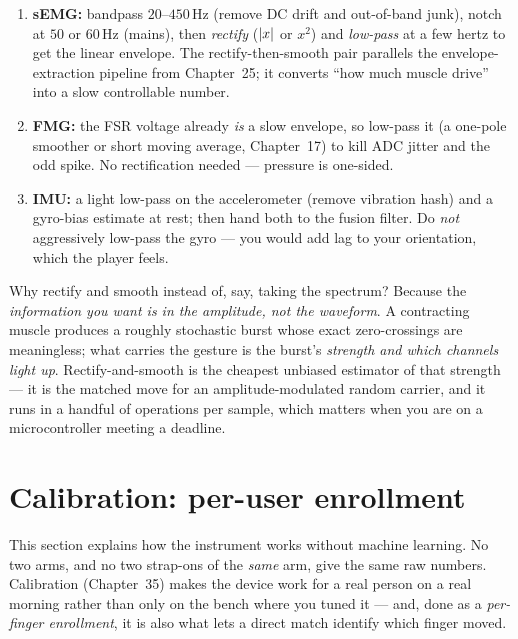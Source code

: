 \begin{enumerate}
  \item \textbf{sEMG:} bandpass $20$--$450\,$Hz (remove DC drift and out-of-band
        junk), notch at $50$ or $60\,$Hz (mains), then \emph{rectify}
        ($\lvert x\rvert$ or $x^2$) and \emph{low-pass} at a few hertz to get the
        linear envelope. The rectify-then-smooth pair parallels the envelope-extraction pipeline from Chapter~25; it converts
        ``how much muscle drive'' into a slow controllable number.
  \item \textbf{FMG:} the FSR voltage already \emph{is} a slow envelope, so
        low-pass it (a one-pole smoother or short moving average, Chapter~17) to
        kill ADC jitter and the odd spike. No rectification needed --- pressure
        is one-sided.
  \item \textbf{IMU:} a light low-pass on the accelerometer (remove vibration
        hash) and a gyro-bias estimate at rest; then hand both to the fusion
        filter. Do \emph{not} aggressively low-pass the gyro --- you would add
        lag to your orientation, which the player feels.
\end{enumerate}

\begin{whybox}
Why rectify and smooth instead of, say, taking the spectrum? Because the
\emph{information you want is in the amplitude, not the waveform}. A contracting
muscle produces a roughly stochastic burst whose exact zero-crossings are
meaningless; what carries the gesture is the burst's \emph{strength and which
channels light up}. Rectify-and-smooth is the cheapest unbiased estimator of
that strength --- it is the matched move for an amplitude-modulated random
carrier, and it runs in a handful of operations per sample, which matters when
you are on a microcontroller meeting a deadline.
\end{whybox}

\section{Calibration: per-user enrollment}
\label{ch41:calibration}

This section explains how the instrument works without machine learning. No
two arms, and no two strap-ons of the \emph{same} arm, give the same raw numbers.
Calibration (Chapter~35) makes the device work for a real person on a real
morning rather than only on the bench where you tuned it --- and, done as a
\emph{per-finger enrollment}, it is also what lets a direct match identify which
finger moved.

